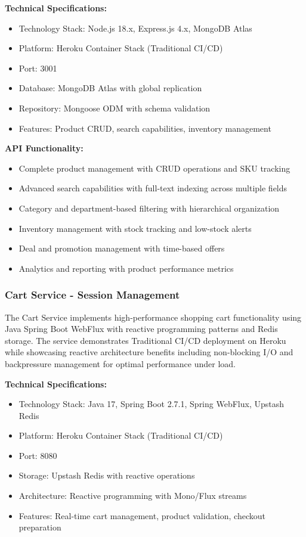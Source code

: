 \textbf{Technical Specifications:}
\begin{itemize}
\item Technology Stack: Node.js 18.x, Express.js 4.x, MongoDB Atlas
\item Platform: Heroku Container Stack (Traditional CI/CD)
\item Port: 3001
\item Database: MongoDB Atlas with global replication
\item Repository: Mongoose ODM with schema validation
\item Features: Product CRUD, search capabilities, inventory management
\end{itemize}

\textbf{API Functionality:}
\begin{itemize}
\item Complete product management with CRUD operations and SKU tracking
\item Advanced search capabilities with full-text indexing across multiple fields
\item Category and department-based filtering with hierarchical organization
\item Inventory management with stock tracking and low-stock alerts
\item Deal and promotion management with time-based offers
\item Analytics and reporting with product performance metrics
\end{itemize}

\subsubsection{Cart Service - Session Management}

The Cart Service implements high-performance shopping cart functionality using Java Spring Boot WebFlux with reactive programming patterns and Redis storage. The service demonstrates Traditional CI/CD deployment on Heroku while showcasing reactive architecture benefits including non-blocking I/O and backpressure management for optimal performance under load.

\textbf{Technical Specifications:}
\begin{itemize}
\item Technology Stack: Java 17, Spring Boot 2.7.1, Spring WebFlux, Upstash Redis
\item Platform: Heroku Container Stack (Traditional CI/CD)
\item Port: 8080
\item Storage: Upstash Redis with reactive operations
\item Architecture: Reactive programming with Mono/Flux streams
\item Features: Real-time cart management, product validation, checkout preparation
\end{itemize}

